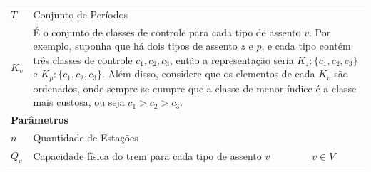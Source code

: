 \begin{table}[H]
\begin{tabular}{p{2cm} p{9.5cm} p{3.2cm}}
		$T$                & Conjunto de Períodos                                                                                                                                                                                                                                                                                                                                                                                           &                                              \\
		$K_v$              & \multicolumn{2}{p{12.7cm}}{É o conjunto de classes de controle para cada tipo de assento $v$. Por exemplo, suponha que há dois tipos de assento $z$ e $p$, e cada tipo contém três classes de controle $c_1, c_2, c_3$, então a representação seria $K_z:\{c_1,c_2,c_3\}$ e $K_p:\{c_1,c_2,c_3\}$. Além disso, considere que os elementos de cada $K_v$ são ordenados, onde sempre se cumpre que a classe de menor índice é a classe mais custosa, ou seja $c_1>c_2>c_3$.}                    \\ \midrule
		\multicolumn{3}{l}{\textbf{Parâmetros}}                                                                                                                                                                                                                                                                                                                                                                                                                                                           \\ \midrule
		$n$                & Quantidade de Estações                                                                                                                                                                                                                                                                                                                                                                                                        &                                              \\
		$Q_v$              & Capacidade física do trem para cada tipo de assento $v$                                                                                                                                                                                                                                                                                                                                                                         & $v \in V$                                    \\

\end{tabular}
\end{table}
